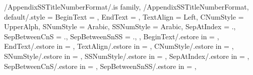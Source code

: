 \newcommand\GetAppendixSectionTitleNumberFormatString{}
\newcommand\SetupAppendixSectionTitleNumberFormatString
{%
  \SetupTitleNumberFormatString{AppendixSection}%
  {%
    BeginText=\GetAppendixSTitleNumberFormatBeginText,%
    EndText=\GetAppendixSTitleNumberFormatEndText,%
    CNumStyle=\GetAppendixSTitleNumberFormatCNumStyle,%
    SNumStyle=\GetAppendixSTitleNumberFormatSNumStyle,%
    SepAtIndex=\GetAppendixSTitleNumberFormatSepAtIndex,%
    SepBetweenCnS=\GetAppendixSTitleNumberFormatSepBetweenCnS,%
    CCounterName=appendixchapter,%
    SCounterName=appendixsection,%
  }{\GetAppendixSectionTitleNumberFormatString}%
} %


\pgfkeys
{
  /AppendixSSTitleNumberFormat/.is family, /AppendixSSTitleNumberFormat,
  default/.style =
  {
    BeginText = \empty,
    EndText = \empty,
    TextAlign = {Left},
    CNumStyle = UpperAlph,
    SNumStyle = Arabic,
    SSNumStyle = Arabic,
    SepAtIndex = {.}, %
    SepBetweenCnS = {.}, %
    SepBetweenSnSS = {.}, %
  },
  BeginText/.estore in = \GetAppendixSSTitleNumberFormatBeginText,
  EndText/.estore in = \GetAppendixSSTitleNumberFormatEndText,
  TextAlign/.estore in = \GetAppendixSSTitleNumberFormatTextAlign,
  CNumStyle/.estore in = \GetAppendixSSTitleNumberFormatCNumStyle,
  SNumStyle/.estore in = \GetAppendixSSTitleNumberFormatSNumStyle,
  SSNumStyle/.estore in = \GetAppendixSSTitleNumberFormatSSNumStyle,
  SepAtIndex/.estore in = \GetAppendixSSTitleNumberFormatSepAtIndex,
  SepBetweenCnS/.estore in = \GetAppendixSSTitleNumberFormatSepBetweenCnS,
  SepBetweenSnSS/.estore in = \GetAppendixSSTitleNumberFormatSepBetweenSnSS,
} %

\newcommand\GetAppendixSubSectionTitleNumberFormatString{}
\newcommand\SetupAppendixSubSectionTitleNumberFormatString
{%
  \SetupTitleNumberFormatString{AppendixSubSection}%
  {%
    BeginText=\GetAppendixSSTitleNumberFormatBeginText,%
    EndText=\GetAppendixSSTitleNumberFormatEndText,%
    CNumStyle=\GetAppendixSSTitleNumberFormatCNumStyle,%
    SNumStyle=\GetAppendixSSTitleNumberFormatSNumStyle,%
    SSNumStyle=\GetAppendixSSTitleNumberFormatSSNumStyle,%
    SepAtIndex=\GetAppendixSSTitleNumberFormatSepAtIndex,%
    SepBetweenCnS=\GetAppendixSSTitleNumberFormatSepBetweenCnS,%
    SepBetweenSnSS=\GetAppendixSSTitleNumberFormatSepBetweenSnSS,%
    CCounterName=appendixchapter,%
    SCounterName=appendixsection,%
    SSCounterName=appendixsubsection,%
  }{\GetAppendixSubSectionTitleNumberFormatString}%
} %

